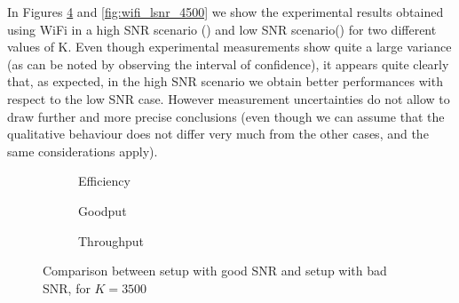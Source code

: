 In Figures \ref{fig:wifi_lsnr_3500} and \ref{fig:wifi_lsnr_4500} we show the experimental results obtained using WiFi in a high SNR scenario () and low SNR scenario() for two different values of K. Even though experimental measurements show quite a large variance (as can be noted by observing the interval of confidence), it appears quite clearly that, as expected, in the high SNR scenario we obtain better performances with respect to the low SNR case. However measurement uncertainties do not allow to draw further and more precise conclusions (even though we can assume that the qualitative behaviour does not differ very much from the other cases, and the same considerations apply).
\begin{figure}[t]
\centering
\begin{subfigure}{0.23\textwidth}
	\captionsetup{justification=centering,font=scriptsize}
	\centering
	\setlength\fwidth{\textwidth}
	\setlength{}
	
	\caption{Efficiency}
	\label{fig:wifi_eff_lsnr_3500}
\end{subfigure}\hspace{2em}%
\begin{subfigure}{0.23\textwidth}
	\captionsetup{justification=centering,font=scriptsize}
	\centering
	\setlength\fwidth{\textwidth}
	\setlength{}
	
	\caption{Goodput}
	\label{fig:wifi_good_lsnr_3500}
\end{subfigure}\hspace{2em}%
\begin{subfigure}{0.23\textwidth}
	\captionsetup{justification=centering,font=scriptsize}
	\centering
	\setlength\fwidth{\textwidth}
	\setlength{}
	
	\caption{Throughput}
	\label{fig:wifi_thr_lsnr_3500}
\end{subfigure}
\caption{Comparison between setup with good SNR and setup with bad SNR, for $K=3500$}
\label{fig:wifi_lsnr_3500}
\end{figure}

